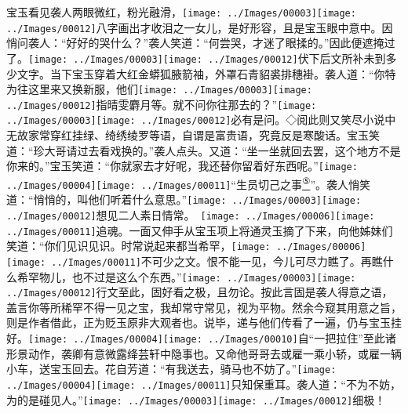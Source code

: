 宝玉看见袭人两眼微红，粉光融滑，{\texttt{[image: ../Images/00003]}\texttt{[image: ../Images/00012]}\footnotesize \kaishu 八字画出才收泪之一女儿，是好形容，且是宝玉眼中意中。}因悄问袭人：``好好的哭什么？''袭人笑道：``何尝哭，才迷了眼揉的。''因此便遮掩过了。{\texttt{[image: ../Images/00003]}\texttt{[image: ../Images/00012]}\footnotesize \kaishu 伏下后文所补未到多少文字。}当下宝玉穿着大红金蟒狐腋箭袖，外罩石青貂裘排穗褂。袭人道：``你特为往这里来又换新服，他们{\texttt{[image: ../Images/00003]}\texttt{[image: ../Images/00012]}\footnotesize \kaishu 指晴雯麝月等。}就不问你往那去的？''{\texttt{[image: ../Images/00003]}\texttt{[image: ../Images/00012]}\footnotesize \kaishu 必有是问。◇阅此则又笑尽小说中无故家常穿红挂绿、绮绣绫罗等语，自谓是富贵语，究竟反是寒酸话。}宝玉笑道：``珍大哥请过去看戏换的。''袭人点头。又道：``坐一坐就回去罢，这个地方不是你来的。''宝玉笑道：``你就家去才好呢，我还替你留着好东西呢。''{\texttt{[image: ../Images/00004]}\texttt{[image: ../Images/00011]}\footnotesize \kaishu ``生员切己之事}\href{../Text/part0023_split_000.html\#lnkback_5_a}{\textsuperscript{⑤}}{''。}袭人悄笑道：``悄悄的，叫他们听着什么意思。''{\texttt{[image: ../Images/00003]}\texttt{[image: ../Images/00012]}\footnotesize \kaishu 想见二人素日情常。　\texttt{[image: ../Images/00006]}\texttt{[image: ../Images/00011]}\footnotesize \kaishu 追魂。}一面又伸手从宝玉项上将通灵玉摘了下来，向他姊妹们笑道：``你们见识见识。时常说起来都当希罕，{\texttt{[image: ../Images/00006]}\texttt{[image: ../Images/00011]}\footnotesize \kaishu 不可少之文。}恨不能一见，今儿可尽力瞧了。再瞧什么希罕物儿，也不过是这么个东西。''{\texttt{[image: ../Images/00003]}\texttt{[image: ../Images/00012]}\footnotesize \kaishu 行文至此，固好看之极，且勿论。按此言固是袭人得意之语，盖言你等所稀罕不得一见之宝，我却常守常见，视为平物。然余今窥其用意之旨，则是作者借此，正为贬玉原非大观者也。}说毕，递与他们传看了一遍，仍与宝玉挂好。{\texttt{[image: ../Images/00004]}\texttt{[image: ../Images/00010]}\footnotesize \kaishu 自``一把拉住''至此诸形景动作，袭卿有意微露绛芸轩中隐事也。}又命他哥哥去或雇一乘小轿，或雇一辆小车，送宝玉回去。花自芳道：``有我送去，骑马也不妨了。''{\texttt{[image: ../Images/00004]}\texttt{[image: ../Images/00011]}\footnotesize \kaishu 只知保重耳。}袭人道：``不为不妨，为的是碰见人。''{\texttt{[image: ../Images/00003]}\texttt{[image: ../Images/00012]}\footnotesize \kaishu 细极！}

